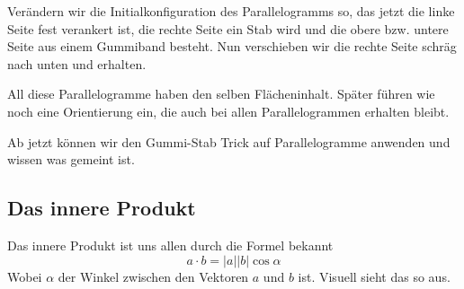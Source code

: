 \documentclass[fleqn]{scrartcl}
\numberwithin{equation}{section}
\begin{document}
Verändern wir die Initialkonfiguration des Parallelogramms so, das jetzt
die linke Seite fest verankert ist, die rechte Seite ein Stab wird und die
obere bzw. untere Seite aus einem Gummiband besteht. Nun verschieben wir die
rechte Seite schräg nach unten und erhalten.
\begin{center}
\begin{minipage}{\linewidth}
\centering
{}
\label{fig:gummiUndStab3}
\end{minipage}
\end{center}
All diese Parallelogramme haben den selben Flächeninhalt. Später führen wie
noch eine Orientierung ein, die auch bei allen Parallelogrammen erhalten
bleibt.

Ab jetzt können wir den Gummi-Stab Trick auf Parallelogramme anwenden und
wissen was gemeint ist.
\newpage
\subsection{Das innere Produkt}
Das innere Produkt ist uns allen durch die Formel bekannt
\[a\cdot b = |a||b|\cos\alpha \]
Wobei $\alpha$ der Winkel zwischen den Vektoren $a$ und $b$ ist. Visuell sieht
das so aus.
\begin{center}
\begin{minipage}{\linewidth}
\centering
{}
\label{fig:innerProduct}
\end{minipage}
\end{center}
\end{document}
